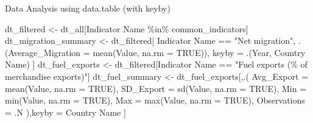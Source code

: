 \documentclass[
  8pt,
  ignorenonframetext,
]{beamer}
\newenvironment{Shaded}{\begin{snugshade}}{\end{snugshade}}
\newcommand{\AttributeTok}[1]{\textcolor[rgb]{0.40,0.45,0.13}{#1}}
\newcommand{\ConstantTok}[1]{\textcolor[rgb]{0.56,0.35,0.01}{#1}}
\newcommand{\FunctionTok}[1]{\textcolor[rgb]{0.28,0.35,0.67}{#1}}
\newcommand{\NormalTok}[1]{\textcolor[rgb]{0.00,0.23,0.31}{#1}}
\newcommand{\OtherTok}[1]{\textcolor[rgb]{0.00,0.23,0.31}{#1}}
\newcommand{\SpecialCharTok}[1]{\textcolor[rgb]{0.37,0.37,0.37}{#1}}
\newcommand{\StringTok}[1]{\textcolor[rgb]{0.13,0.47,0.30}{#1}}
\begin{document}
\begin{frame}[fragile]{Data Analysis using data.table (with keyby)}
\begin{Shaded}
\begin{Highlighting}[]
\NormalTok{dt\_filtered }\OtherTok{\textless{}{-}}\NormalTok{ dt\_all[}\StringTok{\textasciigrave{}}\AttributeTok{Indicator Name}\StringTok{\textasciigrave{}} \SpecialCharTok{\%in\%}\NormalTok{ common\_indicators]}
\NormalTok{dt\_migration\_summary }\OtherTok{\textless{}{-}}\NormalTok{ dt\_filtered[}
  \StringTok{\textasciigrave{}}\AttributeTok{Indicator Name}\StringTok{\textasciigrave{}} \SpecialCharTok{==} \StringTok{"Net migration"}\NormalTok{,}
\NormalTok{  .(}\AttributeTok{Average\_Migration =} \FunctionTok{mean}\NormalTok{(Value, }\AttributeTok{na.rm =} \ConstantTok{TRUE}\NormalTok{)),}
\NormalTok{  keyby }\OtherTok{=}\NormalTok{ .(Year, }\StringTok{\textasciigrave{}}\AttributeTok{Country Name}\StringTok{\textasciigrave{}}\NormalTok{)}
\NormalTok{]}
\NormalTok{dt\_fuel\_exports }\OtherTok{\textless{}{-}}\NormalTok{ dt\_filtered[}\StringTok{\textasciigrave{}}\AttributeTok{Indicator Name}\StringTok{\textasciigrave{}} \SpecialCharTok{==}
                                 \StringTok{"Fuel exports (\% of merchandise exports)"}\NormalTok{]}
\NormalTok{dt\_fuel\_summary }\OtherTok{\textless{}{-}}\NormalTok{ dt\_fuel\_exports[,.(}
    \AttributeTok{Avg\_Export =} \FunctionTok{mean}\NormalTok{(Value, }\AttributeTok{na.rm =} \ConstantTok{TRUE}\NormalTok{),}
    \AttributeTok{SD\_Export =} \FunctionTok{sd}\NormalTok{(Value, }\AttributeTok{na.rm =} \ConstantTok{TRUE}\NormalTok{),}
    \AttributeTok{Min =} \FunctionTok{min}\NormalTok{(Value, }\AttributeTok{na.rm =} \ConstantTok{TRUE}\NormalTok{),}
    \AttributeTok{Max =} \FunctionTok{max}\NormalTok{(Value, }\AttributeTok{na.rm =} \ConstantTok{TRUE}\NormalTok{),}
    \AttributeTok{Observations =}\NormalTok{ .N}
\NormalTok{  ),keyby }\OtherTok{=} \StringTok{\textasciigrave{}}\AttributeTok{Country Name}\StringTok{\textasciigrave{}}
\NormalTok{]}
\end{Highlighting}
\end{Shaded}
\end{frame}
\end{document}
